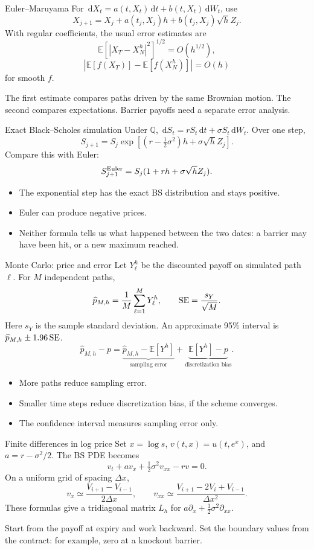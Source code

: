 \documentclass[handout,10pt,t,aspectratio=169]{beamer}
\newcommand{\E}{\mathbb E}
\newcommand{\Q}{\mathbb Q}
\newcommand{\dd}{\,\mathrm d}
\begin{document}
\begin{frame}{Euler--Maruyama}
\small
For \(\dd X_t=a(t,X_t)\dd t+b(t,X_t)\dd W_t\), use
\[
 \boxed{X_{j+1}=X_j+a(t_j,X_j)h+b(t_j,X_j)\sqrt h Z_j.}
\]
With regular coefficients, the usual error estimates are
\[
 \E[|X_T-X_N^h|^2]^{1/2}=O(h^{1/2}),
\]
\[
 |\E[f(X_T)]-\E[f(X_N^h)]|=O(h)
\]
for smooth \(f\).

The first estimate compares paths driven by the same Brownian motion.
The second compares expectations. Barrier payoffs need a separate error analysis.
\end{frame}

\begin{frame}{Exact Black--Scholes simulation}
\small
Under \(\Q\), \(\dd S_t=rS_t\dd t+\sigma S_t\dd W_t\). Over one step,
\[
 \boxed{S_{j+1}=S_j\exp\!\left[(r-\tfrac12\sigma^2)h+\sigma\sqrt h Z_j\right].}
\]
Compare this with Euler:
\[
 S_{j+1}^{\rm Euler}=S_j(1+rh+\sigma\sqrt h Z_j).
\]
\begin{itemize}
\item The exponential step has the exact BS distribution and stays positive.
\item Euler can produce negative prices.
\item Neither formula tells us what happened between the two dates:
a barrier may have been hit, or a new maximum reached.
\end{itemize}
\end{frame}

\begin{frame}{Monte Carlo: price and error}
\small
Let \(Y_\ell^h\) be the discounted payoff on simulated path \(\ell\).
For \(M\) independent paths,
\[
 \widehat p_{M,h}=\frac1M\sum_{\ell=1}^M Y_\ell^h,
 \qquad {\rm SE}=\frac{s_Y}{\sqrt M}.
\]
Here \(s_Y\) is the sample standard deviation. An approximate 95\% interval is
\(\widehat p_{M,h}\pm1.96\,{\rm SE}\).
\[
 \widehat p_{M,h}-p=
 \underbrace{\widehat p_{M,h}-\E[Y^h]}_{\text{sampling error}}
 +\underbrace{\E[Y^h]-p}_{\text{discretization bias}}.
\]
\begin{itemize}
\item More paths reduce sampling error.
\item Smaller time steps reduce discretization bias, if the scheme converges.
\item The confidence interval measures sampling error only.
\end{itemize}
\end{frame}


\begin{frame}{Finite differences in log price}
\small
Set \(x=\log s\), \(v(t,x)=u(t,e^x)\), and \(a=r-\sigma^2/2\).
The BS PDE becomes
\[
 v_t+av_x+\tfrac12\sigma^2v_{xx}-rv=0.
\]
On a uniform grid of spacing \(\Delta x\),
\[
 v_x\simeq\frac{V_{i+1}-V_{i-1}}{2\Delta x},\qquad
 v_{xx}\simeq\frac{V_{i+1}-2V_i+V_{i-1}}{\Delta x^2}.
\]
These formulas give a tridiagonal matrix \(L_h\) for
\(a\partial_x+\tfrac12\sigma^2\partial_{xx}\).

\medskip
Start from the payoff at expiry and work backward. Set the boundary
values from the contract: for example, zero at a knockout barrier.
\end{frame}
\end{document}
